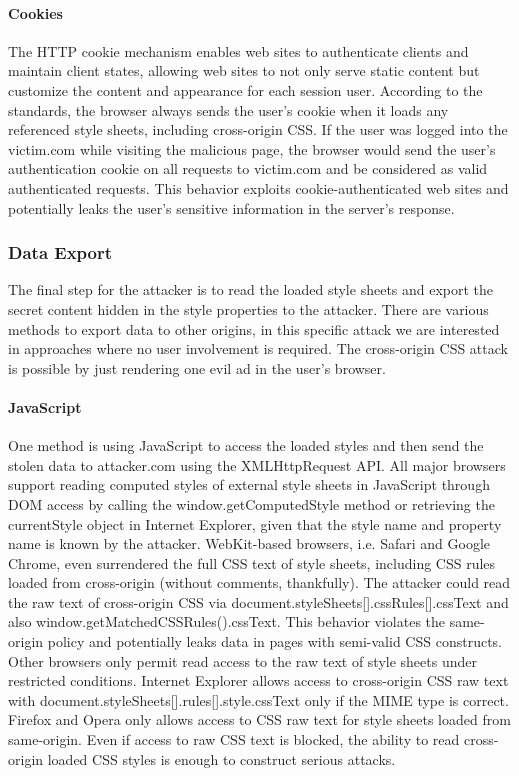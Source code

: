 \documentclass{acm_proc_article-sp}
\begin{document}
{\paragraph{Cookies}
The HTTP cookie mechanism enables web sites to authenticate clients and maintain client states, allowing web sites to not only serve static content but customize the content and appearance for each session user. According to the standards, the browser always sends the user's cookie when it loads any referenced style sheets, including cross-origin CSS. If the user was logged into the victim.com while visiting the malicious page, the browser would send the user's authentication cookie on all requests to victim.com and be considered as valid authenticated requests. This behavior exploits cookie-authenticated web sites and potentially leaks the user's sensitive information in the server's response. 

\subsubsection{Data Export}
The final step for the attacker is to read the loaded style sheets and export the secret content hidden in the style properties to the attacker. There are various methods to export data to other origins, in this specific attack we are interested in approaches where no user involvement is required. The cross-origin CSS attack is possible by just rendering one evil ad in the user's browser. 

\paragraph{JavaScript}
One method is using JavaScript to access the loaded styles and then send the stolen data to attacker.com using the XMLHttpRequest API. All major browsers support reading computed styles of external style sheets in JavaScript through DOM access by calling the window.getComputedStyle method or retrieving the currentStyle object in Internet Explorer, given that the style name and property name is known by the attacker. WebKit-based browsers, i.e. Safari and Google Chrome, even surrendered the full CSS text of style sheets, including CSS rules loaded from cross-origin (without comments, thankfully). The attacker could read the raw text of cross-origin CSS via document.styleSheets[].cssRules[].cssText and also window.getMatchedCSSRules().cssText. This behavior violates the same-origin policy and potentially leaks data in pages with semi-valid CSS constructs. Other browsers only permit read access to the raw text of style sheets under restricted conditions. Internet Explorer allows access to cross-origin CSS raw text with document.styleSheets[].rules[].style.cssText only if the MIME type is correct. Firefox and Opera only allows access to CSS raw text for style sheets loaded from same-origin.
Even if access to raw CSS text is blocked, the ability to read cross-origin loaded CSS styles is enough to construct serious attacks.

}
\end{document}
